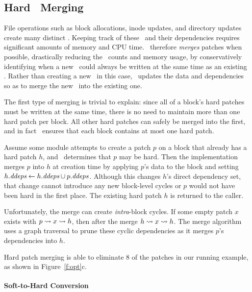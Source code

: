 
\subsection{Hard \ChDesc\ Merging}
\label{sec:patch:merge}

File operations such as block allocations, inode updates, and directory updates
create many distinct \chdescs. Keeping track of these
\chdescs\ and their dependencies requires significant amounts of memory and
CPU time.
%
\Kudos\ therefore \emph{merges} patches when possible, drastically reducing
the \chdesc\ counts and memory usage, by conservatively identifying when a
new \patch\ could always be written at the same time as an existing \patch.
%
Rather than creating a new \chdesc\ in this case, \Kudos\ updates the data
and dependencies so as to merge the new \patch\ into the existing one.


The first type of merging is trivial to explain:
%
since all of a block's hard patches must be written at the same time, there
is no need to maintain more than one hard patch per block.
%
All other hard patches can safely be merged into the first,
%
and in fact \Kudos\ ensures that each block contains at most one hard
patch.


Assume some module attempts to create a patch $p$ on a block that already
has a hard patch $h$, and \Kudos\ determines that $p$ may be hard.
%
Then the implementation merges $p$ into $h$ at creation time by applying
$p$'s data to the block and setting $\PDDepset{h} \gets \PDDepset{h} \cup
\PDDepset{p}$.
%
Although this changes $h$'s direct dependency set, that change cannot
introduce any new block-level cycles or $p$ would not have been hard in the
first place.
%
The existing hard patch $h$ is returned to the caller.


Unfortunately, the merge can create \emph{intra}-block cycles.
%
If some empty patch $x$ exists with $p \leadsto x \leadsto h$, then after
the merge $h \leadsto x \leadsto h$.
%
The merge algorithm uses a graph traversal to prune these cyclic
dependencies as it merges $p$'s dependencies into $h$.


Hard patch merging is able to eliminate 8 of the patches in our running
example, as shown in Figure~\ref{f:opt}c.


\paragraph{Soft-to-Hard Conversion}

